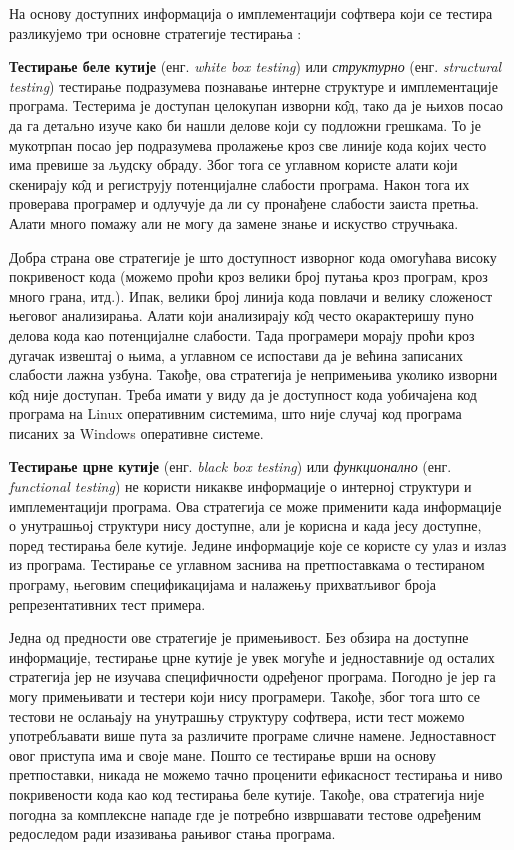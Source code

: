 \documentclass[12pt,oneside]{memoir}
\begin{document}
На основу доступних информација о имплементацији софтвера који се тестира разликујемо три основне стратегије тестирања \cite{fuzzingBrute, fuzzing, testMilena}: 

\begin{description}
\item \textbf{Тестирање беле кутије} (енг. \textit{white box testing}) или \textit{структурно} (енг. \textit{structural testing}) тестирање подразумева познавање интерне структуре и имплементације програма. Тестерима је доступан целокупан изворни к\^{о}д, тако да је њихов посао да га детаљно изуче како би нашли делове који су подложни грешкама. То је мукотрпан посао јер подразумева пролажење кроз све линије кода којих често има превише за људску обраду. Због тога се углавном користе алати који скенирају к\^{о}д и региструју потенцијалне слабости програма. Након тога их проверава програмер и одлучује да ли су пронађене слабости заиста претња. Алати много помажу али не могу да замене знање и искуство стручњака. 
\par Добра страна ове стратегије је што доступност изворног кода омогућава високу покривеност кода (можемо проћи кроз велики број путања кроз програм, кроз много грана, итд.). Ипак, велики број линија кода повлачи и велику сложеност његовог анализирања. Алати који анализирају к\^{о}д често окарактеришу пуно делова кода као потенцијалне слабости. Тада програмери морају проћи кроз дугачак извештај о њима, а углавном се испостави да је већина записаних слабости лажна узбуна. Такође, ова стратегија је непримењива уколико изворни к\^{о}д није доступан. Треба имати у виду да је доступност кода уобичајена код програма на Linux оперативним системима, што није случај код програма писаних за Windows оперативне системе. 

\item \textbf{Тестирање црне кутије} (енг. \textit{black box testing}) или \textit{функционално} (енг. \textit{functional testing}) не користи никакве информације о интерној структури и имплементацији програма. Ова стратегија се може применити када информације о унутрашњој структури нису доступне, али је корисна и када јесу доступне, поред тестирања беле кутије. Једине информације које се користе су улаз и излаз из програма. Тестирање се углавном заснива на претпоставкама о тестираном програму, његовим спецификацијама и налажењу прихватљивог броја репрезентативних тест примера.
\par Једна од предности ове стратегије је примењивост. Без обзира на доступне информације, тестирање црне кутије је увек могуће и једноставније од осталих стратегија јер не изучава специфичности одређеног програма. Погодно је јер га могу примењивати и тестери који нису програмери. Такође, због тога што се тестови не ослањају на унутрашњу структуру софтвера, исти тест можемо употребљавати више пута за различите програме сличне намене. Једноставност овог приступа има и своје мане. Пошто се тестирање врши на основу претпоставки, никада не можемо тачно проценити ефикасност тестирања и ниво покривености кода као код тестирања беле кутије. Такође, ова стратегија није погодна за комплексне нападе где је потребно извршавати тестове одређеним редоследом ради изазивања рањивог стања програма.


\end{description}
\end{document}
